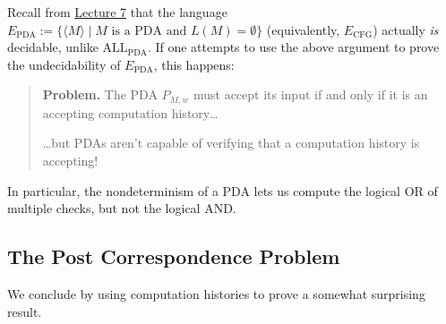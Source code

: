 \begin{remark}
    Recall from
    \href{/18.404/lectures/7/#algorithms-on-grammars-and-turing-machines-a-cfg-e-cfg-eq-cfg-a-tm}{Lecture 7}
    that the language $E_{\mathrm{PDA}} := \{
        \langle M \rangle \mid M \text{ is a PDA and }
        L(M) = \emptyset
    \}$ (equivalently, $E_{\mathrm{CFG}}$)
    actually \emph{is} decidable,
    unlike $\mathrm{ALL}_{\mathrm{PDA}}$.
    If one attempts to use the above argument
    to prove the undecidability of $E_{\mathrm{PDA}}$,
    this happens:
    \begin{quote}
        \textbf{Problem.}
        The PDA $P_{M, w}$ must accept its input
        if and only if it is an accepting computation history\dots

        \dots but PDAs aren't capable of verifying
        that a computation history is accepting!
    \end{quote}
    In particular, the nondeterminism of a PDA
    lets us compute the logical OR of multiple checks,
    but not the logical AND.
\end{remark}

\subsection{The Post Correspondence Problem}

We conclude by using computation histories
to prove a somewhat surprising result.

